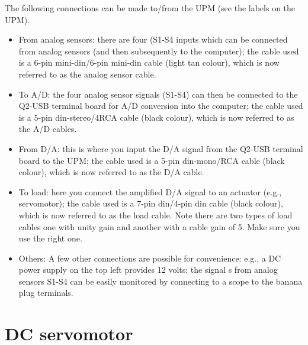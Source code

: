 The following connections can be made to/from the UPM (see the labels on the
UPM).
\begin{itemize}
\item From analog sensors: there are four (S1-S4 inputs which can be
connected from analog sensors (and then subsequently to the computer); the
cable used is a 6-pin mini-din/6-pin mini-din cable (light tan colour), which
is now referred to as the analog sensor cable.

\item To A/D: the four analog sensor signals (S1-S4) can then be connected to
the Q2-USB terminal board for A/D conversion into the computer; the cable
used is a 5-pin din-stereo/4RCA cable (black colour), which is now referred to
as the A/D cables.

\item From D/A: this is where you input the D/A signal from the Q2-USB
terminal board to the UPM; the cable used is a 5-pin din-mono/RCA cable
(black colour), which is now referred to as the D/A cable.

\item To load: here you connect the amplified D/A signal to an actuator
(e.g., servomotor); the cable used is a 7-pin din/4-pin din cable (black
colour), which is now referred to as the load cable.  Note there are two types
of load cables one with unity gain and another with a cable gain of 5.  Make
sure you use the right one.

\item Others: A few other connections are possible for convenience: e.g., a
DC power supply on the top left provides 12 volts; the signal s from analog
sensors S1-S4 can be easily monitored by connecting to a scope to the banana
plug terminals.
\end{itemize}

\section{DC servomotor}

